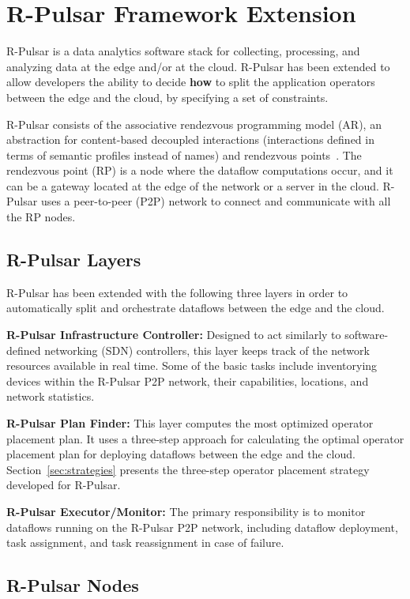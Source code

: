 \section{R-Pulsar Framework Extension}\label{sec:framework}
R-Pulsar is a data analytics software stack for collecting, processing, and analyzing data at the edge and/or at the cloud. R-Pulsar has been extended to allow developers the ability to decide \textbf{how} to split the application operators between the edge and the cloud, by specifying a set of constraints. 

R-Pulsar consists of the associative rendezvous programming model (AR), an abstraction for content-based decoupled interactions (interactions defined in terms of semantic profiles instead of names) and rendezvous points~\cite{Renart2018EdgeBD}. The rendezvous point (RP) is a node where the dataflow computations occur, and it can be a gateway located at the edge of the network or a server in the cloud. R-Pulsar uses a peer-to-peer (P2P) network to connect and communicate with all the RP nodes. 

\subsection{R-Pulsar Layers}
R-Pulsar has been extended with the following three layers in order to automatically split and orchestrate dataflows between the edge and the cloud. 

\textbf{R-Pulsar Infrastructure Controller:} Designed to act similarly to software-defined networking (SDN) controllers, this layer keeps track of the network resources available in real time. Some of the basic tasks include inventorying devices within the R-Pulsar P2P network, their capabilities, locations, and network statistics.

\textbf{R-Pulsar Plan Finder:} This layer computes the most optimized operator placement plan. It uses a three-step approach for calculating the optimal operator placement plan for deploying dataflows between the edge and the cloud. Section~\ref{sec:strategies} presents the three-step operator placement strategy developed for R-Pulsar.

\textbf{R-Pulsar Executor/Monitor:} The primary responsibility is to monitor dataflows running on the R-Pulsar P2P network, including dataflow deployment, task assignment, and task reassignment in case of failure.

\subsection{R-Pulsar Nodes}

